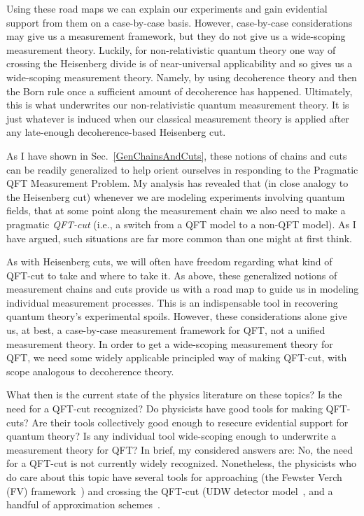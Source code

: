 \documentclass[12pt,prd,superscriptaddress,floatfix,amsmath,amssymb,amsfonts,nofootinbib]{revtex4-2}
\begin{document}
Using these road maps we can explain our experiments and gain evidential support from them on a case-by-case basis. However, case-by-case considerations may give us a measurement framework, but they do not give us a  wide-scoping measurement theory. Luckily, for non-relativistic quantum theory one way of crossing the Heisenberg divide is of near-universal applicability and so gives us a wide-scoping measurement theory. Namely, by using decoherence theory and then the Born rule once a sufficient amount of decoherence has happened. Ultimately, this is what underwrites our non-relativistic quantum measurement theory. It is just whatever is induced when our classical measurement theory is applied after any late-enough decoherence-based Heisenberg cut.

As I have shown in Sec.~\ref{GenChainsAndCuts}, these notions of chains and cuts can be readily generalized to help orient ourselves in responding to the Pragmatic QFT Measurement Problem. My analysis has revealed that (in close analogy to the Heisenberg cut) whenever we are modeling experiments involving quantum fields, that at some point along the  measurement chain we also need to make a pragmatic \textit{QFT-cut} (i.e., a switch from a QFT model to a non-QFT model). As I have argued, such situations are far more common than one might at first think.

As with Heisenberg cuts, we will often have freedom regarding what kind of QFT-cut to take and where to take it. As above, these generalized notions of measurement chains and cuts provide us with a road map to guide us in modeling individual measurement processes. This is an indispensable tool in recovering quantum theory's experimental spoils. However, these considerations alone give us, at best, a case-by-case measurement framework for QFT, not a unified measurement theory. In order to get a wide-scoping measurement theory for QFT, we need some widely applicable principled way of making QFT-cut, with scope analogous to decoherence theory.

What then is the current state of the physics literature on these topics? Is the need for a QFT-cut recognized? Do physicists have good tools for making QFT-cuts? Are their tools collectively good enough to resecure evidential support for quantum theory? Is any individual tool wide-scoping enough to underwrite a measurement theory for QFT? In brief, my considered answers are: No, the need for a QFT-cut is not currently widely recognized. Nonetheless, the physicists who do care about this topic have several tools for approaching (the Fewster Verch (FV) framework~\cite{fewster1,fewster2,fewster3,Ruep2021}) and crossing the QFT-cut (UDW detector model~\cite{Unruh1976,BLHu2007, Brown2013, Hotta2020, Zeromode,TaleOfTwo,Adam,Valentini1991, Reznik2003, Pozas-Kerstjens:2015,Menicucci, Terno2016, Cosmo, Henderson2018}, and a handful of approximation schemes~\cite{Rosaler,FlaminiaAchim}. 
\end{document}
